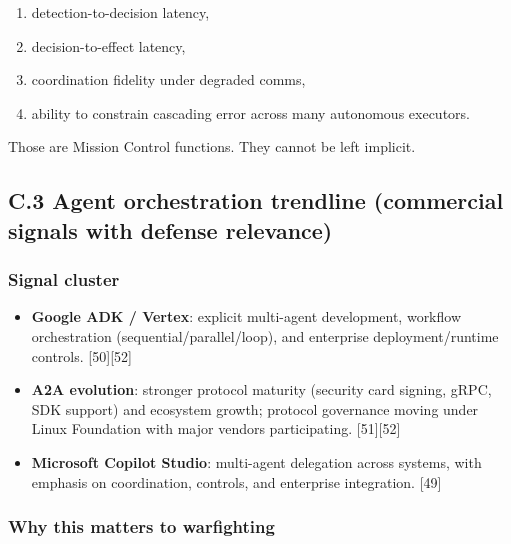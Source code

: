 \documentclass[
]{article}
\providecommand{\tightlist}{%
  \setlength{\itemsep}{0pt}\setlength{\parskip}{0pt}}
\begin{document}
\begin{enumerate}
\def\labelenumi{\arabic{enumi}.}
\tightlist
\item
  detection-to-decision latency,
\item
  decision-to-effect latency,
\item
  coordination fidelity under degraded comms,
\item
  ability to constrain cascading error across many autonomous executors.
\end{enumerate}

Those are Mission Control functions. They cannot be left implicit.

\hypertarget{c.3-agent-orchestration-trendline-commercial-signals-with-defense-relevance}{%
\subsection{C.3 Agent orchestration trendline (commercial signals with
defense
relevance)}\label{c.3-agent-orchestration-trendline-commercial-signals-with-defense-relevance}}

\hypertarget{signal-cluster}{%
\subsubsection{Signal cluster}\label{signal-cluster}}

\begin{itemize}
\tightlist
\item
  \textbf{Google ADK / Vertex}: explicit multi-agent development,
  workflow orchestration (sequential/parallel/loop), and enterprise
  deployment/runtime controls. {[}50{]}{[}52{]}
\item
  \textbf{A2A evolution}: stronger protocol maturity (security card
  signing, gRPC, SDK support) and ecosystem growth; protocol governance
  moving under Linux Foundation with major vendors participating.
  {[}51{]}{[}52{]}
\item
  \textbf{Microsoft Copilot Studio}: multi-agent delegation across
  systems, with emphasis on coordination, controls, and enterprise
  integration. {[}49{]}
\end{itemize}

\hypertarget{why-this-matters-to-warfighting}{%
\subsubsection{Why this matters to
warfighting}\label{why-this-matters-to-warfighting}}
\end{document}
